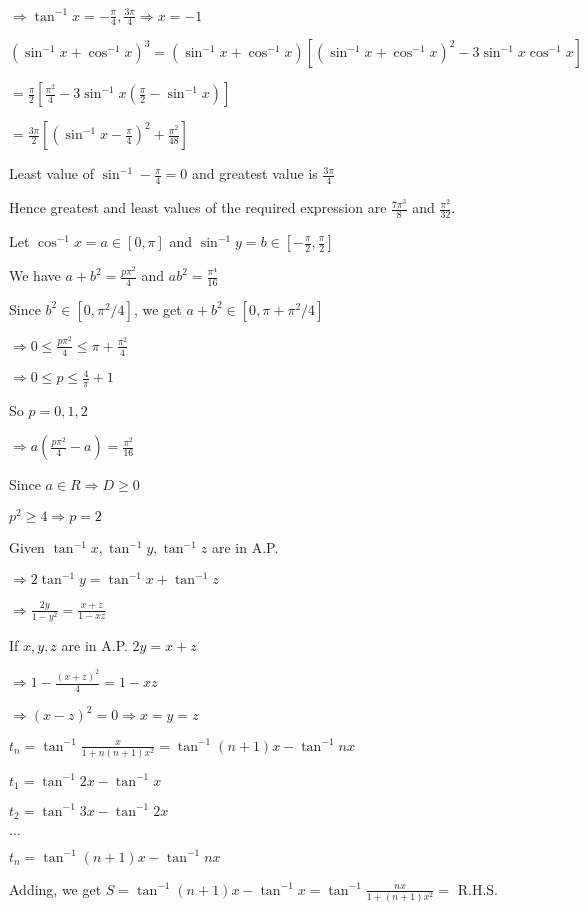   $\Rightarrow \tan^{-1}x = -\frac{\pi}{4}, \frac{3\pi}{4} \Rightarrow x = -1$

\item $(\sin^{-1}x + \cos^{-1}x)^3 = (\sin^{-1}x + \cos^{-1}x)[(\sin^{-1}x + \cos^{-1}x)^2 - 3\sin^{-1}x\cos^{-1}x]$

  $= \frac{\pi}{2}\left[\frac{\pi^2}{4} - 3\sin^{-1}x\left(\frac{\pi}{2} - \sin^{-1}x\right)\right]$

  $= \frac{3\pi}{2}\left[\left(\sin^{-1}x - \frac{\pi}{4}\right)^2 + \frac{\pi^2}{48}\right]$

  Least value of $\sin^{-1} - \frac{\pi}{4} = 0$ and greatest value is $\frac{3\pi}{4}$

  Hence greatest and least values of the required expression are $\frac{7\pi^3}{8}$ and $\frac{\pi^2}{32}$.

\item Let $\cos^{-1}x = a \in [0, \pi]$ and $\sin^{-1}y = b \in\left[-\frac{\pi}{2}, \frac{\pi}{2}\right]$

  We have $a + b^2 = \frac{p\pi^2}{4}$ and $ab^2 = \frac{\pi^4}{16}$

  Since $b^2\in [0, \pi^2/4]$, we get $a + b^2 \in [0, \pi + \pi^2/4]$

  $\Rightarrow 0 \leq \frac{p\pi^2}{4}\leq \pi + \frac{\pi^2}{4}$

  $\Rightarrow 0\leq p\leq \frac{4}{\pi} + 1$

  So $p = 0, 1, 2$

  $\Rightarrow a\left(\frac{p\pi^2}{4} - a\right) = \frac{\pi^2}{16}$

  Since $a\in R \Rightarrow D\geq 0$

  $p^2 \geq 4\Rightarrow p = 2$

\item Given $\tan^{-1}x, \tan^{-1}y, \tan^{-1}z$ are in A.P.

  $\Rightarrow 2\tan^{-1}y = \tan^{-1}x + \tan^{-1}z$

  $\Rightarrow \frac{2y}{1 - y^2} = \frac{x + z}{1 - xz}$

  If $x, y, z$ are in A.P. $2y = x + z$

  $\Rightarrow 1 - \frac{(x + z)^2}{4} = 1 - xz$

  $\Rightarrow (x - z)^2 = 0 \Rightarrow x = y = z$

\item $t_n = \tan^{-1}\frac{x}{1 + n(n + 1)x^2} = \tan^{-1}(n + 1)x - \tan^{-1}nx$

  $t_1 = \tan^{-1}2x - \tan^{-1}x$

  $t_2 = \tan^{-1}3x - \tan^{-1}2x$

  $\ldots$

  $t_n = \tan^{-1}(n + 1)x - \tan^{-1}nx$

  Adding, we get $S = \tan^{-1}(n + 1)x - \tan^{-1}x = \tan^{-1}\frac{nx}{1 + (n + 1)x^2} =$ R.H.S.
\stopitemize
